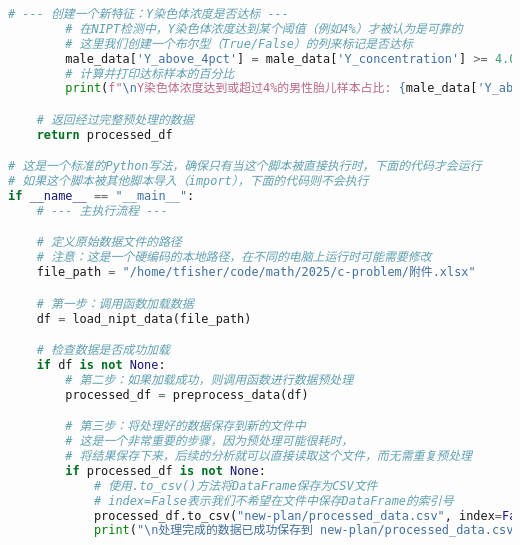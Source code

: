 \documentclass[UTF8, a4paper, 11pt]{ctexart}
\begin{document}
\begin{lstlisting}[language=Python, caption={数据加载与预处理脚本。}]
        # --- 创建一个新特征：Y染色体浓度是否达标 ---
        # 在NIPT检测中，Y染色体浓度达到某个阈值（例如4%）才被认为是可靠的
        # 这里我们创建一个布尔型（True/False）的列来标记是否达标
        male_data['Y_above_4pct'] = male_data['Y_concentration'] >= 4.0
        # 计算并打印达标样本的百分比
        print(f"\nY染色体浓度达到或超过4%的男性胎儿样本占比: {male_data['Y_above_4pct'].mean()*100:.2f}%")

    # 返回经过完整预处理的数据
    return processed_df

# 这是一个标准的Python写法，确保只有当这个脚本被直接执行时，下面的代码才会运行
# 如果这个脚本被其他脚本导入（import），下面的代码则不会执行
if __name__ == "__main__":
    # --- 主执行流程 ---

    # 定义原始数据文件的路径
    # 注意：这是一个硬编码的本地路径，在不同的电脑上运行时可能需要修改
    file_path = "/home/tfisher/code/math/2025/c-problem/附件.xlsx"

    # 第一步：调用函数加载数据
    df = load_nipt_data(file_path)

    # 检查数据是否成功加载
    if df is not None:
        # 第二步：如果加载成功，则调用函数进行数据预处理
        processed_df = preprocess_data(df)

        # 第三步：将处理好的数据保存到新的文件中
        # 这是一个非常重要的步骤，因为预处理可能很耗时，
        # 将结果保存下来，后续的分析就可以直接读取这个文件，而无需重复预处理
        if processed_df is not None:
            # 使用.to_csv()方法将DataFrame保存为CSV文件
            # index=False表示我们不希望在文件中保存DataFrame的索引号
            processed_df.to_csv("new-plan/processed_data.csv", index=False)
            print("\n处理完成的数据已成功保存到 new-plan/processed_data.csv")
\end{lstlisting}
\end{document}
